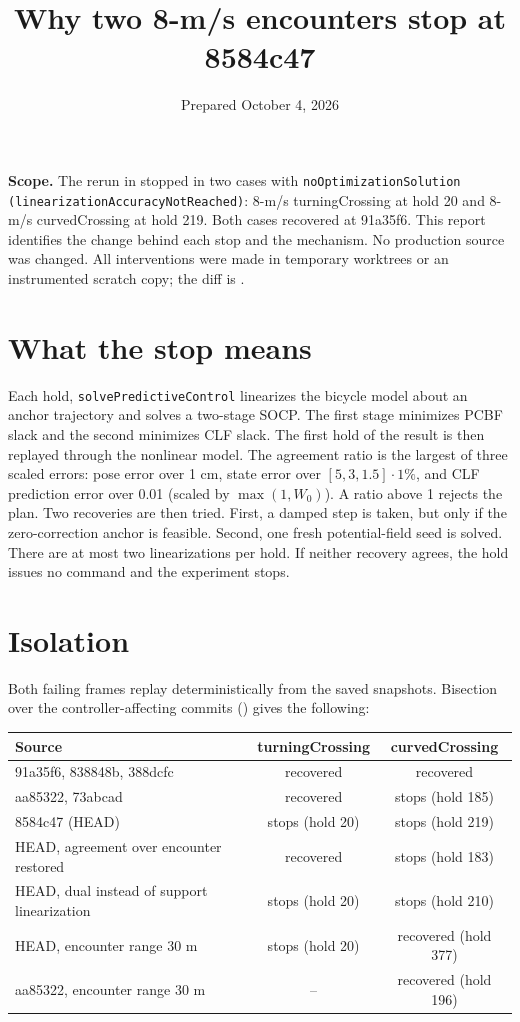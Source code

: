 \documentclass[11pt]{article}
\title{Why two 8-m/s encounters stop at 8584c47}
\date{Prepared October 4, 2026}
\begin{document}
\maketitle

\textbf{Scope.} The rerun in  stopped
in two cases with \texttt{noOptimizationSolution
(linearizationAccuracyNotReached)}: 8-m/s turningCrossing at hold 20 and
8-m/s curvedCrossing at hold 219. Both cases recovered at 91a35f6. This
report identifies the change behind each stop and the mechanism. No
production source was changed. All interventions were made in temporary
worktrees or an instrumented scratch copy; the diff is
.

\section{What the stop means}
Each hold, \texttt{solvePredictiveControl} linearizes the bicycle model about
an anchor trajectory and solves a two-stage SOCP. The first stage minimizes
PCBF slack and the second minimizes CLF slack. The first hold of the result
is then replayed through the nonlinear model. The agreement ratio is the
largest of three scaled errors: pose error over 1 cm, state error over
$[5,3,1.5]\cdot 1\%$, and CLF prediction error over 0.01 (scaled by
$\max(1,W_0)$). A ratio above 1 rejects the plan. Two recoveries are then
tried. First, a damped step is taken, but only if the zero-correction anchor
is feasible. Second, one fresh potential-field seed is solved. There are at
most two linearizations per hold. If neither recovery agrees, the hold
issues no command and the experiment stops.

\section{Isolation}
Both failing frames replay deterministically from the saved snapshots.
Bisection over the controller-affecting commits
() gives the following:

\begin{center}
\begin{tabular}{lcc}
\toprule
Source & turningCrossing & curvedCrossing \\
\midrule
91a35f6, 838848b, 388dcfc & recovered & recovered \\
aa85322, 73abcad & recovered & stops (hold 185) \\
8584c47 (HEAD) & stops (hold 20) & stops (hold 219) \\
\midrule
HEAD, agreement over encounter restored & recovered & stops (hold 183) \\
HEAD, dual instead of support linearization & stops (hold 20) & stops (hold 210) \\
HEAD, encounter range 30 m & stops (hold 20) & recovered (hold 377) \\
aa85322, encounter range 30 m & -- & recovered (hold 196) \\
\bottomrule
\end{tabular}
\end{center}
\end{document}
